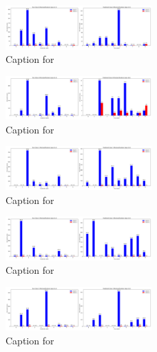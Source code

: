 \documentclass[12pt, a4paper]{article}
\begin{document}
\begin{figure}[ht]
\centering
\includegraphics[width=0.5\textwidth]{combined_class_boundary_pgd/combined_class_8_misclassifications_eps_0.3.png}
\caption{Caption for }
\label{fig:combined_class_8_misclassifications_eps_0.3.png}
\end{figure}


\begin{figure}[ht]
\centering
\includegraphics[width=0.5\textwidth]{combined_class_boundary_pgd/combined_class_0_misclassifications_eps_0.4.png}
\caption{Caption for }
\label{fig:combined_class_0_misclassifications_eps_0.4.png}
\end{figure}



\begin{figure}[ht]
\centering
\includegraphics[width=0.5\textwidth]{combined_class_boundary_pgd/combined_class_1_misclassifications_eps_0.4.png}
\caption{Caption for }
\label{fig:combined_class_1_misclassifications_eps_0.4.png}
\end{figure}

\begin{figure}[ht]
\centering
\includegraphics[width=0.5\textwidth]{combined_class_boundary_pgd/combined_class_2_misclassifications_eps_0.4.png}
\caption{Caption for }
\label{fig:combined_class_2_misclassifications_eps_0.4.png}
\end{figure}

\begin{figure}[ht]
\centering
\includegraphics[width=0.5\textwidth]{combined_class_boundary_pgd/combined_class_3_misclassifications_eps_0.4.png}
\caption{Caption for }
\label{fig:combined_class_3_misclassifications_eps_0.4.png}
\end{figure}
\end{document}
